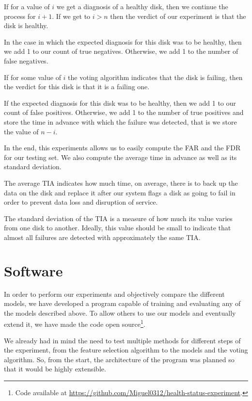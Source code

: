 If for a value of $i$ we get a diagnosis of a healthy disk, then we continue the process for $i+1$.
If we get to $i > n$ then the verdict of our experiment is that the disk is healthy.

In the case in which the expected diagnosis for this disk was to be healthy, then we add 1 to our count of true negatives.
Otherwise, we add 1 to the number of false negatives.

If for some value of $i$ the voting algorithm indicates that the disk is failing, then the verdict for this disk is that it is a failing one.

If the expected diagnosis for this disk was to be healthy, then we add 1 to our count of false positives.
Otherwise, we add 1 to the number of true positives and store the time in advance with which the failure was detected, that is we store the value of $n-i$.

In the end, this experiments allows us to easily compute the FAR and the FDR for our testing set.
We also compute the average time in advance as well as its standard deviation.

The average TIA indicates how much time, on average, there is to back up the data on the disk and replace it after our system flags a disk as going to fail in order to prevent data loss and disruption of service. 

The standard deviation of the TIA is a measure of how much its value varies from one disk to another.
Ideally, this value should be small to indicate that almost all failures are detected with approximately the same TIA.

\section{Software}\label{sec:software}

In order to perform our experiments and objectively compare the different models, we have developed a program capable of training and evaluating any of the models described above.
To allow others to use our models and eventually extend it, we have made the code open source\footnote{Code available at \url{https://github.com/Miguel0312/health-status-experiment}.}.

We already had in mind the need to test multiple methods for different steps of the experiment, from the feature selection algorithm to the models and the voting algorithm.
So, from the start, the architecture of the program was planned so that it would be highly extensible.


